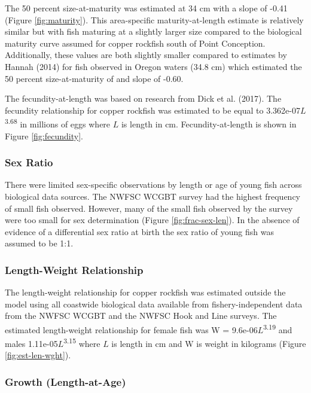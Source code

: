 \documentclass[11pt,
  english,
  letterpaper,
]{article}
\begin{document}
The 50 percent size-at-maturity was estimated at 34 cm with a slope of -0.41 (Figure \ref{fig:maturity}). This area-specific maturity-at-length estimate is relatively similar but with fish maturing at a slightly larger size compared to the biological maturity curve assumed for copper rockfish south of Point Conception. Additionally, these values are both slightly smaller compared to estimates by Hannah (2014) for fish observed in Oregon waters (34.8 cm) which estimated the 50 percent size-at-maturity of and slope of -0.60.

The fecundity-at-length was based on research from Dick et al. (2017). The fecundity relationship for copper rockfish was estimated to be equal to 3.362e-07\(L\)\textsuperscript{3.68} in millions of eggs where \(L\) is length in cm. Fecundity-at-length is shown in Figure \ref{fig:fecundity}.

\hypertarget{sex-ratio}{%
\subsubsection{Sex Ratio}\label{sex-ratio}}

There were limited sex-specific observations by length or age of young fish across biological data sources. The NWFSC WCGBT survey had the highest frequency of small fish observed. However, many of the small fish observed by the survey were too small for sex determination (Figure \ref{fig:frac-sex-len}). In the absence of evidence of a differential sex ratio at birth the sex ratio of young fish was assumed to be 1:1.

\hypertarget{length-weight-relationship}{%
\subsubsection{Length-Weight Relationship}\label{length-weight-relationship}}

The length-weight relationship for copper rockfish was estimated outside the model using all coastwide biological data available from fishery-independent data from the NWFSC WCGBT and the NWFSC Hook and Line surveys. The estimated length-weight relationship for female fish was W = 9.6e-06\(L\)\textsuperscript{3.19} and males 1.11e-05\(L\)\textsuperscript{3.15} where \(L\) is length in cm and W is weight in kilograms (Figure \ref{fig:est-len-wght}).

\hypertarget{length-at-age}{%
\subsubsection{Growth (Length-at-Age)}\label{length-at-age}}
\end{document}
